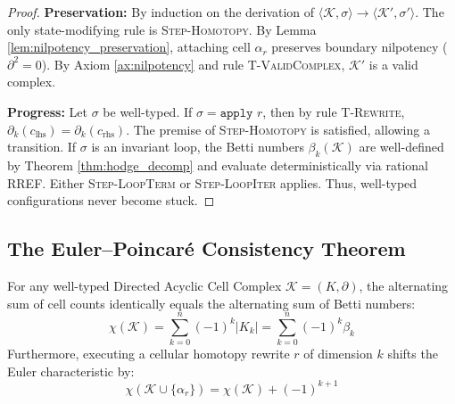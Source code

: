 \begin{proof}
\textbf{Preservation:} By induction on the derivation of $\langle \mathcal{K}, \sigma \rangle \longrightarrow \langle \mathcal{K}', \sigma' \rangle$. The only state-modifying rule is \textsc{Step-Homotopy}. By Lemma \ref{lem:nilpotency_preservation}, attaching cell $\alpha_r$ preserves boundary nilpotency ($\partial^2 = 0$). By Axiom \ref{ax:nilpotency} and rule \textsc{T-ValidComplex}, $\mathcal{K}'$ is a valid complex.

\textbf{Progress:} Let $\sigma$ be well-typed. If $\sigma = \texttt{apply } r$, then by rule \textsc{T-Rewrite}, $\partial_k(c_{\text{lhs}}) = \partial_k(c_{\text{rhs}})$. The premise of \textsc{Step-Homotopy} is satisfied, allowing a transition. If $\sigma$ is an invariant loop, the Betti numbers $\beta_k(\mathcal{K})$ are well-defined by Theorem \ref{thm:hodge_decomp} and evaluate deterministically via rational RREF. Either \textsc{Step-LoopTerm} or \textsc{Step-LoopIter} applies. Thus, well-typed configurations never become stuck.
\end{proof}

\subsection{The Euler--Poincar\'e Consistency Theorem}
\begin{theorem}
\label{thm:euler_poincare}
For any well-typed Directed Acyclic Cell Complex $\mathcal{K} = (K, \partial)$, the alternating sum of cell counts identically equals the alternating sum of Betti numbers:
\begin{equation}
    \chi(\mathcal{K}) = \sum_{k=0}^n (-1)^k |K_k| = \sum_{k=0}^n (-1)^k \beta_k
\end{equation}
Furthermore, executing a cellular homotopy rewrite $r$ of dimension $k$ shifts the Euler characteristic by:
\begin{equation}
    \chi(\mathcal{K} \cup \{\alpha_r\}) = \chi(\mathcal{K}) + (-1)^{k+1}
\end{equation}
\end{theorem}

